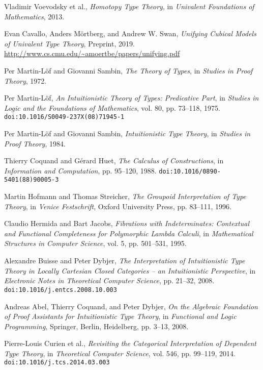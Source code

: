 \documentclass{article}
\theoremstyle{definition}
\begin{document}
\newpage
\begin{thebibliography}{99}

Vladimir Voevodsky et al.,
\textit{Homotopy Type Theory},
in \textit{Univalent Foundations of Mathematics},
2013.

Evan Cavallo, Anders Mörtberg, and Andrew W. Swan,
\textit{Unifying Cubical Models of Univalent Type Theory},
Preprint, 2019.
\url{http://www.cs.cmu.edu/~amoertbe/papers/unifying.pdf}

Per Martin-Löf and Giovanni Sambin,
\textit{The Theory of Types},
in \textit{Studies in Proof Theory},
1972.

Per Martin-Löf,
\textit{An Intuitionistic Theory of Types: Predicative Part},
in \textit{Studies in Logic and the Foundations of Mathematics},
vol. 80, pp. 73–118, 1975.
\texttt{doi:10.1016/S0049-237X(08)71945-1}

Per Martin-Löf and Giovanni Sambin,
\textit{Intuitionistic Type Theory},
in \textit{Studies in Proof Theory},
1984.

Thierry Coquand and Gérard Huet,
\textit{The Calculus of Constructions},
in \textit{Information and Computation},
pp. 95–120, 1988.
\texttt{doi:10.1016/0890-5401(88)90005-3}

Martin Hofmann and Thomas Streicher,
\textit{The Groupoid Interpretation of Type Theory},
in \textit{Venice Festschrift},
Oxford University Press, pp. 83–111, 1996.

Claudio Hermida and Bart Jacobs,
\textit{Fibrations with Indeterminates: Contextual and Functional Completeness for Polymorphic Lambda Calculi},
in \textit{Mathematical Structures in Computer Science},
vol. 5, pp. 501–531, 1995.

Alexandre Buisse and Peter Dybjer,
\textit{The Interpretation of Intuitionistic Type Theory in Locally Cartesian Closed Categories -- an Intuitionistic Perspective},
in \textit{Electronic Notes in Theoretical Computer Science},
pp. 21–32, 2008.
\texttt{doi:10.1016/j.entcs.2008.10.003}

Andreas Abel, Thierry Coquand, and Peter Dybjer,
\textit{On the Algebraic Foundation of Proof Assistants for Intuitionistic Type Theory},
in \textit{Functional and Logic Programming},
Springer, Berlin, Heidelberg, pp. 3–13, 2008.

Pierre-Louis Curien et al.,
\textit{Revisiting the Categorical Interpretation of Dependent Type Theory},
in \textit{Theoretical Computer Science},
vol. 546, pp. 99–119, 2014.
\texttt{doi:10.1016/j.tcs.2014.03.003}


\end{thebibliography}
\end{document}
